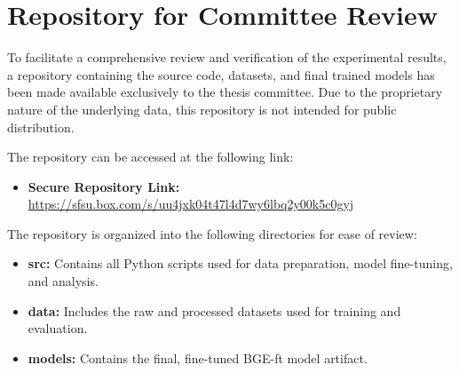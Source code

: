 \section{Repository for Committee Review}\label{app:repository}
To facilitate a comprehensive review and verification of the experimental results, a repository containing the source code, datasets, and final trained models has been made available exclusively to the thesis committee. Due to the proprietary nature of the underlying data, this repository is not intended for public distribution.

The repository can be accessed at the following link:
\begin{itemize}
    \item \textbf{Secure Repository Link:}\\
    \url{https://sfsu.box.com/s/uu4jxk04t47l4d7wy6lbq2y00k5c0gyj}
\end{itemize}

The repository is organized into the following directories for ease of review:
\begin{itemize}
    \item \textbf{src:} Contains all Python scripts used for data preparation, model fine-tuning, and analysis.
    \item \textbf{data:} Includes the raw and processed datasets used for training and evaluation.
    \item \textbf{models:} Contains the final, fine-tuned BGE-ft model artifact.
\end{itemize}